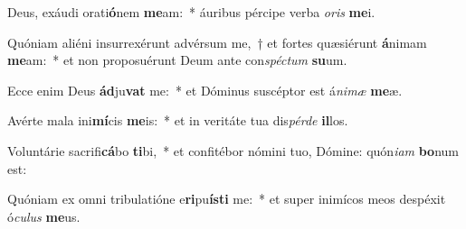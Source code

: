 \item Deus, exáudi orati\textbf{ó}nem \textbf{me}am:~* áuribus pércipe verba \textit{o}\textit{ris} \textbf{me}i.
\item Quóniam aliéni insurrexérunt advérsum me,~† et fortes quæsiérunt \textbf{á}nimam \textbf{me}am:~* et non proposuérunt Deum ante con\textit{spéc}\textit{tum} \textbf{su}um.
\item Ecce enim Deus \textbf{ád}ju\textbf{vat} me:~* et Dóminus suscéptor est á\textit{ni}\textit{mæ} \textbf{me}æ.
\item Avérte mala ini\textbf{mí}cis \textbf{me}is:~* et in veritáte tua dis\textit{pér}\textit{de} \textbf{il}los.
\item Voluntárie sacrifi\textbf{cá}bo \textbf{ti}bi,~* et confitébor nómini tuo, Dómine: quón\textit{i}\textit{am} \textbf{bo}num est:
\item Quóniam ex omni tribulatióne e\textbf{ri}pu\textbf{ís}\textbf{ti} me:~* et super inimícos meos despéxit ó\textit{cu}\textit{lus} \textbf{me}us.
